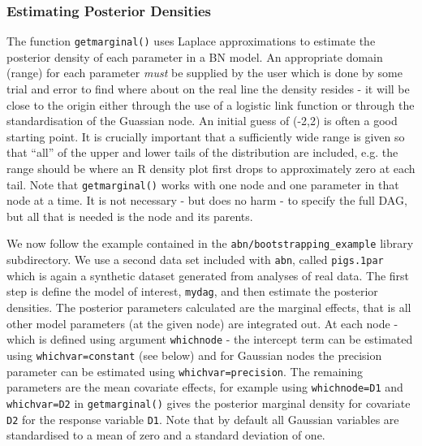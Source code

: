 \documentclass[nojss]{jss}
\begin{document}
\subsubsection{Estimating Posterior Densities}
The function {\tt getmarginal()} uses Laplace approximations to estimate the posterior density of each parameter in a BN model. An appropriate domain (range) for each parameter \emph{must} be supplied by the user which is done by some trial and error to find where about on the real line the density resides - it will be close to the origin either through the use of a logistic link function or through the standardisation of the Guassian node. An initial guess of (-2,2) is often a good starting point. It is crucially important that a sufficiently wide range is given so that ``all'' of the upper and lower tails of the distribution are included, e.g. the range should be where an R density plot first drops to approximately zero at each tail. Note that {\tt getmarginal()} works with one node and one parameter in that node at a time. It is not necessary - but does no harm - to specify the full DAG, but all that is needed is the node and its parents.  

We now follow the example contained in the {\tt abn/bootstrapping\_example} library subdirectory. We use a second data set included with {\tt abn}, called {\tt pigs.1par} which is again a synthetic dataset generated from analyses of real data. The first step is define the model of interest, {\tt mydag}, and then  estimate the posterior densities. The posterior parameters calculated are the marginal effects, that is all other model parameters (at the given node) are integrated out. At each node - which is defined using argument {\tt whichnode} - the intercept term can be estimated using {\tt whichvar=constant} (see below) and for Gaussian nodes the precision parameter can be estimated using {\tt whichvar=precision}. The remaining parameters are the mean covariate effects, for example using {\tt whichnode=D1} and {\tt whichvar=D2} in {\tt getmarginal()} gives the posterior marginal density for covariate {\tt D2} for the response variable {\tt D1}. Note that by default all Gaussian variables are standardised to a mean of zero and a standard deviation of one. 
\end{document}
